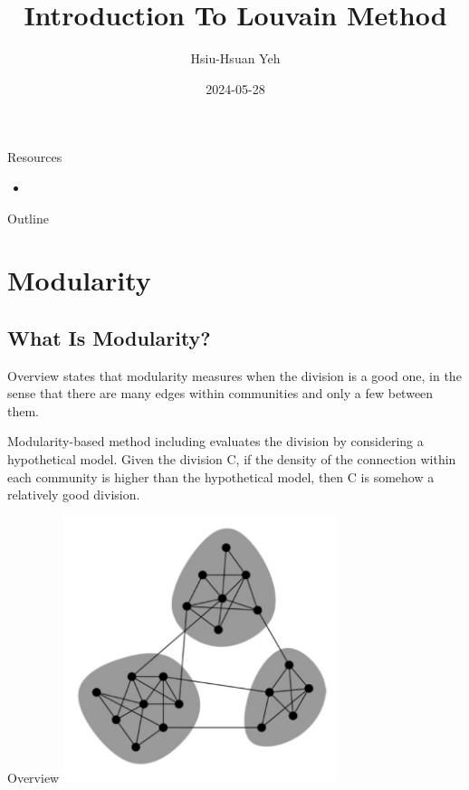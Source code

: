 \documentclass[12pt]{beamer}
\title{\huge{Introduction To Louvain Method}}
\author{Hsiu-Hsuan Yeh}
\date{2024-05-28}
\begin{document}
\maketitle


\begin{frame}{Resources}
\begin{itemize}
    \item \cite{leskovec2021communities}
\end{itemize}
\end{frame}


\begin{frame}{Outline}
\tableofcontents
\end{frame}


\section{Modularity}
\subsection{What Is Modularity?}
\begin{frame}{Overview}
\cite{clauset2004finding} states that modularity measures when the division is
a good one, in the sense that there are many edges within communities and only
a few between them.

Modularity-based method including \cite{blondel2008fast} evaluates the division by
considering a hypothetical model. Given the division
C, if the density of the connection within each community is
higher than the hypothetical model, then C is somehow a relatively good division.
\end{frame}


\begin{frame}{Overview}
\centering
\includegraphics[width=8cm]{img/img1.png}
\end{frame}
\end{document}
